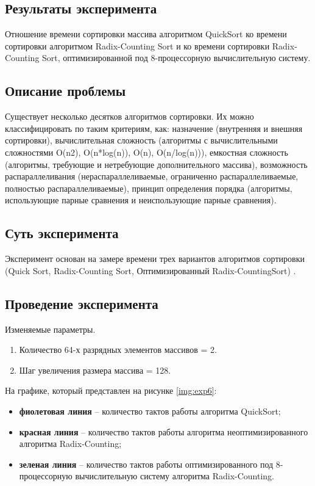 \subsection{Результаты эксперимента}
Отношение времени сортировки массива алгоритмом QuickSort ко времени сортировки алгоритмом Radix-Counting Sort  и ко времени сортировки Radix-Counting Sort, оптимизированной под 8-процессорную вычислительную систему.


\subsection{Описание проблемы}
Существует несколько десятков алгоритмов сортировки. Их можно классифицировать по таким критериям, как: назначение (внутренняя и внешняя сортировки), вычислительная сложность (алгоритмы с вычислительными сложностями O(n2), O(n*log(n)), O(n), O(n/log(n))), емкостная сложность (алгоритмы, требующие и нетребующие   дополнительного   массива),   возможность   распараллеливания   (нераспараллеливаемые, ограниченно распараллеливаемые, полностью распараллеливаемые), принцип   определения   порядка   (алгоритмы,   использующие   парные   сравнения   и   неиспользующие парные сравнения).

\subsection{Суть эксперимента}  
Эксперимент основан на замере времени трех вариантов алгоритмов сортировки (Quick Sort, Radix-Counting Sort, Оптимизированный Radix-CountingSort) .


\subsection{Проведение эксперимента}

Изменяемые параметры.

\begin{enumerate}
	\item Количество 64-х разрядных элементов массивов = 2.
	\item Шаг увеличения размера массива = 128.
\end{enumerate}

На графике, который представлен на рисунке \ref{img:exp6}:
\begin{itemize}
	\item \textbf{фиолетовая линия} -- количество тактов работы алгоритма QuickSort;
	\item \textbf{красная линия} -- количество тактов работы алгоритма неоптимизированного алгоритма Radix-Counting;
	\item \textbf{зеленая линия} -- количество тактов работы оптимизированного под 8-процессорную вычислительную систему алгоритма Radix-Counting.
\end{itemize}

